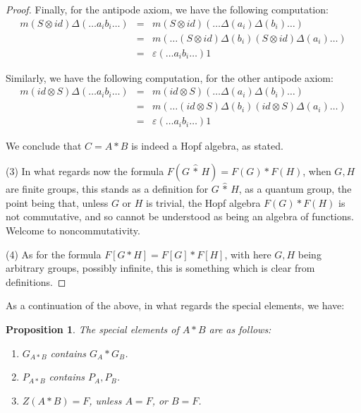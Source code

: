 \documentclass[12pt]{amsbook}
\newtheorem{proposition}[theorem]{Proposition}
\begin{document}
\begin{proof}
Finally, for the antipode axiom, we have the following computation:
\begin{eqnarray*}
m(S\otimes id)\Delta(\ldots a_ib_i\ldots)
&=&m(S\otimes id)(\ldots\Delta(a_i)\Delta(b_i)\ldots)\\
&=&m(\ldots(S\otimes id)\Delta(b_i)(S\otimes id)\Delta(a_i)\ldots)\\
&=&\varepsilon(\ldots a_ib_i\ldots)1
\end{eqnarray*}

Similarly, we have the following computation, for the other antipode axiom:
\begin{eqnarray*}
m(id\otimes S)\Delta(\ldots a_ib_i\ldots)
&=&m(id\otimes S)(\ldots\Delta(a_i)\Delta(b_i)\ldots)\\
&=&m(\ldots(id\otimes S)\Delta(b_i)(id\otimes S)\Delta(a_i)\ldots)\\
&=&\varepsilon(\ldots a_ib_i\ldots)1
\end{eqnarray*}

We conclude that $C=A*B$ is indeed a Hopf algebra, as stated.

\medskip

(3) In what regards now the formula $F(G\,\hat{*}\,H)=F(G)*F(H)$, when $G,H$ are finite groups, this stands as a definition for $G\,\hat{*}\,H$, as a quantum group, the point being that, unless $G$ or $H$ is trivial, the Hopf algebra $F(G)*F(H)$ is not commutative, and so cannot be understood as being an algebra of functions. Welcome to noncommutativity.

\medskip

(4) As for the formula $F[G*H]=F[G]*F[H]$, with here $G,H$ being arbitrary groups, possibly infinite, this is something which is clear from definitions.
\end{proof}

As a continuation of the above, in what regards the special elements, we have:

\begin{proposition}
The special elements of $A*B$ are as follows:
\begin{enumerate}
\item $G_{A*B}$ contains $G_A*G_B$.

\item $P_{A*B}$ contains $P_A,P_B$.

\item $Z(A*B)=F$, unless $A=F$, or $B=F$.
\end{enumerate}
\end{proposition}
\end{document}
